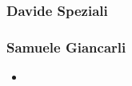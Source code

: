 \subsubsection*{Davide Speziali}

\subsubsection*{Samuele Giancarli}
\begin{itemize}
    \item
\end{itemize}
